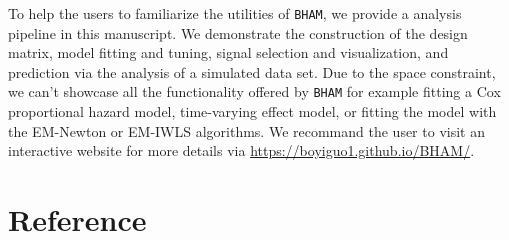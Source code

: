 \documentclass[
]{jss}
\begin{document}
To help the users to familiarize the utilities of \texttt{BHAM}, we
provide a analysis pipeline in this manuscript. We demonstrate the
construction of the design matrix, model fitting and tuning, signal
selection and visualization, and prediction via the analysis of a
simulated data set. Due to the space constraint, we can't showcase all
the functionality offered by \texttt{BHAM} for example fitting a Cox
proportional hazard model, time-varying effect model, or fitting the
model with the EM-Newton or EM-IWLS algorithms. We recommand the user to
visit an interactive website for more details via
\url{https://boyiguo1.github.io/BHAM/}.

\clearpage
\section{Reference}
\end{document}
